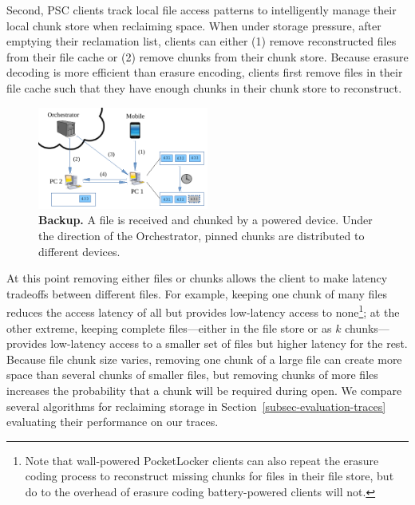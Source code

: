 Second, PSC clients track local file access patterns to intelligently manage
their local chunk store when reclaiming space. When under storage pressure,
after emptying their reclamation list, clients can either (1) remove
reconstructed files from their file cache or (2) remove chunks from their
chunk store. Because erasure decoding is more efficient than erasure
encoding, clients first remove files in their file cache such that they have
enough chunks in their chunk store to reconstruct.

\begin{figure}

\vspace*{-0.3in}

\includegraphics[width=0.5\textwidth]{./figures/backup.pdf}

\vspace*{-0.1in}

\caption{\small \textbf{Backup.} A file is received and chunked by a powered
device.  Under the direction of the Orchestrator, pinned chunks are
distributed to different devices.}

\label{fig-design-backup}

\vspace*{-0.2in}

\end{figure}

At this point removing either files or chunks allows the client to make
latency tradeoffs between different files. For example, keeping one chunk of
many files reduces the access latency of all but provides low-latency access
to none\footnote{Note that wall-powered PocketLocker clients can also repeat
the erasure coding process to reconstruct missing chunks for files in their
file store, but do to the overhead of erasure coding battery-powered clients
will not.}; at the other extreme, keeping complete files---either in the file
store or as $k$ chunks---provides low-latency access to a smaller set of
files but higher latency for the rest. Because file chunk size varies,
removing one chunk of a large file can create more space than several chunks
of smaller files, but removing chunks of more files increases the probability
that a chunk will be required during open. We compare several algorithms for
reclaiming storage in Section~\ref{subsec-evaluation-traces} evaluating their
performance on our traces.

